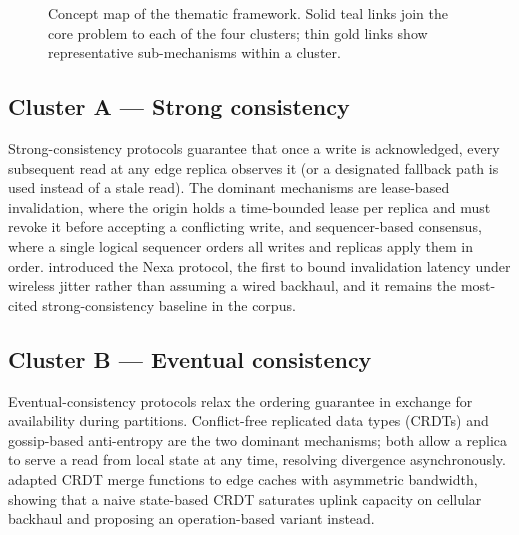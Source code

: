 \begin{figure}[h!]
{}
\caption{Concept map of the thematic framework. Solid teal links join the core problem to each of the
four clusters; thin gold links show representative sub-mechanisms within a cluster.}
\label{fig:conceptmap}
\end{figure}

\subsection{Cluster A --- Strong consistency}

Strong-consistency protocols guarantee that once a write is acknowledged, every subsequent read at any
edge replica observes it (or a designated fallback path is used instead of a stale read). The dominant
mechanisms are lease-based invalidation, where the origin holds a time-bounded lease per replica and
must revoke it before accepting a conflicting write, and sequencer-based consensus, where a single
logical sequencer orders all writes and replicas apply them in order. \citet{chen2015nexa} introduced
the Nexa protocol, the first to bound invalidation latency under wireless jitter rather than assuming a
wired backhaul, and it remains the most-cited strong-consistency baseline in the corpus.

\subsection{Cluster B --- Eventual consistency}

Eventual-consistency protocols relax the ordering guarantee in exchange for availability during
partitions. Conflict-free replicated data types (CRDTs) and gossip-based anti-entropy are the two
dominant mechanisms; both allow a replica to serve a read from local state at any time, resolving
divergence asynchronously. \citet{patel2017synapse} adapted CRDT merge functions to edge caches with
asymmetric bandwidth, showing that a naive state-based CRDT saturates uplink capacity on cellular
backhaul and proposing an operation-based variant instead.


